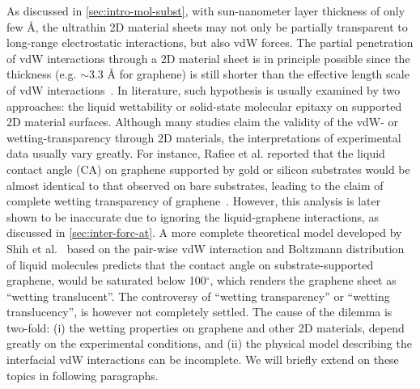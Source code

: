 As discussed in \autoref{sec:intro-mol-subst}, with sun-nanometer layer
thickness of only few \AA{}, the ultra\-thin 2D material sheets may
not only be partially transparent to long-range electrostatic
interactions, but also vdW forces.
%
The partial penetration of vdW interactions through a 2D material
sheet is in principle possible since the thickness (e.g. $\sim{}$3.3
\AA{} for graphene) is still shorter than the effective length scale
of vdW interactions~\autocite{Israelachvili_2011_book}.
%
In literature, such hypothesis is usually examined by two approaches:
the liquid wettability or solid-state molecular epitaxy on supported
2D material surfaces.
%
Although many studies claim the validity of the vdW- or
wetting-transparency through 2D materials, the interpretations of
experimental data usually vary greatly.
%
For instance, Rafiee et al. reported that the liquid contact angle
(CA) on graphene supported by gold or silicon substrates would be
almost identical to that observed on bare substrates, leading to the
claim of complete wetting transparency of
graphene~\autocite{rafiee_2012_transparency}.
%
However, this analysis is later shown to be inaccurate due to
ignoring the liquid-graphene interactions, as discussed in
\autoref{sec:inter-forc-at}.
%
A more complete theoretical model developed by Shih et
al.~\autocite{Shih_2012_prl}  based on the pair-wise
vdW interaction and Boltzmann distribution of liquid molecules
predicts that the contact angle on substrate-supported graphene, would
be saturated below 100$^{\circ}$, which renders the graphene sheet as
``wetting translucent''.
%
The controversy of ``wetting transparency'' or ``wetting
translucency'', is however not completely settled.
%
The cause of the dilemma is two-fold: (i) the wetting properties on
graphene and other 2D materials, depend greatly on the experimental
conditions, and (ii) the physical model describing the interfacial vdW
interactions can be incomplete. We will briefly extend on these topics
in following paragraphs.

